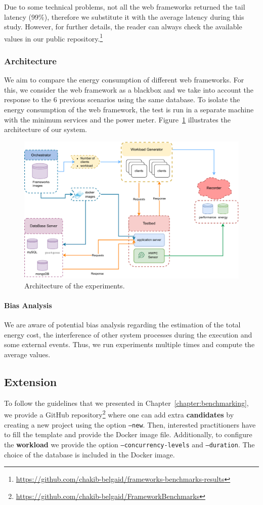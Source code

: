 Due to some technical problems, not all the web frameworks returned the tail latency (99\%), therefore we substitute it with the average latency during this study.
However, for further details, the reader can always check the available values in our public repository.\footnote{\url{https://github.com/chakib-belgaid/frameworks-benchmarks-results}}


\subsubsection{Architecture}
We aim to compare the energy consumption of different web frameworks.
For this, we consider the web framework as a blackbox and we take into account the response to the 6 previous scenarios using the same database.
To isolate the energy consumption of the web framework, the test is run in a separate machine with the minimum services and the power meter.
Figure~\ref{fig:architecture} illustrates the architecture of our system.

\begin{figure}[bht]
    \centering
    \includegraphics[width=.8\columnwidth]{imgs/architecture}
    \caption[Architecture]{Architecture of the experiments.}
    \label{fig:architecture}
\end{figure}


\paragraph{Bias Analysis}
We are aware of potential bias analysis regarding the estimation of the total energy cost, the interference of other system processes during the execution and some external events.
Thus, we run experiments multiple times and compute the average values.

\subsection{Extension}
To follow the guidelines that we presented in Chapter~\ref{chapter:benchmarking}, we provide a GitHub repository\footnote{\url{https://github.com/chakib-belgaid/FrameworkBenchmarks}} where one can add extra \textbf{candidates} by creating a new project using the option \texttt{--new}.
Then, interested practitioners have to fill the template and provide the Docker image file.
Additionally, to configure the \textbf{workload} we provide the option \texttt{--concurrency-levels} and \texttt{--duration}.
The choice of the database is included in the Docker image.

